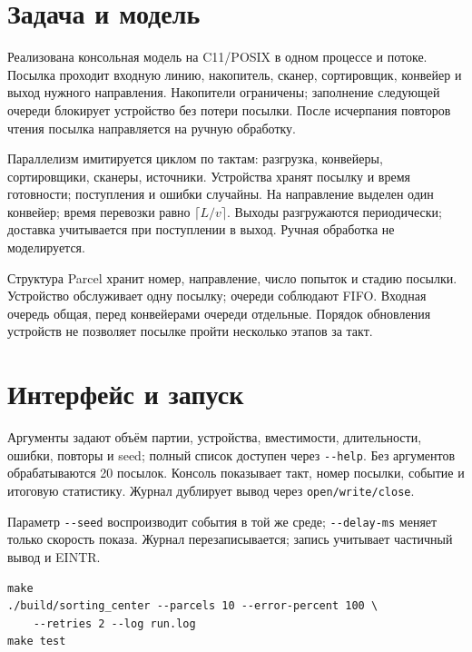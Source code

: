 \section{Задача и модель}
\begin{definition}
Реализована консольная модель на C11/POSIX в одном процессе и потоке. Посылка проходит входную линию, накопитель, сканер, сортировщик, конвейер и выход нужного направления. Накопители ограничены; заполнение следующей очереди блокирует устройство без потери посылки. После исчерпания повторов чтения посылка направляется на ручную обработку.
\end{definition}

Параллелизм имитируется циклом по тактам: разгрузка, конвейеры, сортировщики, сканеры, источники. Устройства хранят посылку и время готовности; поступления и ошибки случайны. На направление выделен один конвейер; время перевозки равно $\lceil L/v\rceil$. Выходы разгружаются периодически; доставка учитывается при поступлении в выход. Ручная обработка не моделируется.

Структура Parcel хранит номер, направление, число попыток и стадию посылки. Устройство обслуживает одну посылку; очереди соблюдают FIFO. Входная очередь общая, перед конвейерами очереди отдельные. Порядок обновления устройств не позволяет посылке пройти несколько этапов за такт.

\section{Интерфейс и запуск}
Аргументы задают объём партии, устройства, вместимости, длительности, ошибки, повторы и seed; полный список доступен через \texttt{-{}-help}. Без аргументов обрабатываются 20 посылок. Консоль показывает такт, номер посылки, событие и итоговую статистику. Журнал дублирует вывод через \texttt{open/write/close}.

Параметр \texttt{-{}-seed} воспроизводит события в той же среде; \texttt{-{}-delay-ms} меняет только скорость показа. Журнал перезаписывается; запись учитывает частичный вывод и EINTR.
\begin{example}
\begin{lstlisting}[basicstyle=\small\ttfamily,frame=none,backgroundcolor=\color{example_back},aboveskip=0pt,belowskip=0pt,xleftmargin=0pt,xrightmargin=0pt]
make
./build/sorting_center --parcels 10 --error-percent 100 \
    --retries 2 --log run.log
make test
\end{lstlisting}
\end{example}
